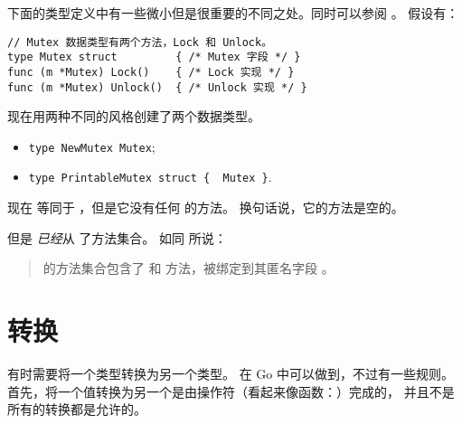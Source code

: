 下面的类型定义中有一些微小但是很重要的不同之处。同时可以参阅 \cite[section~"Type Declarations"]{go_spec}。
假设有：
\begin{lstlisting}
// Mutex 数据类型有两个方法，Lock 和 Unlock。
type Mutex struct         { /* Mutex 字段 */ }
func (m *Mutex) Lock()    { /* Lock 实现 */ }
func (m *Mutex) Unlock()  { /* Unlock 实现 */ }
\end{lstlisting}
现在用两种不同的风格创建了两个数据类型。
\begin{itemize}
\item \lstinline|type NewMutex Mutex|;
\item \lstinline|type PrintableMutex struct {  Mutex }|.
\end{itemize}
现在  等同于 ，但是它没有任何  的方法。
换句话说，它的方法是空的。

但是  \emph{已经}从  了方法集合。
如同 \cite{go_spec} 所说：
\begin{quote}
 的方法集合包含了
 和  方法，被绑定到其匿名字段 。
\end{quote}

\section{转换}
\label{sec:conversions}
有时需要将一个类型转换为另一个类型。
在 Go 中可以做到，不过有一些规则。首先，将一个值转换为另一个是由操作符（看起来像函数：）完成的，
并且不是所有的转换都是允许的。

\begin{table}[H]
\begin{center}
\caption[Valid conversions]{合法的转换， 
\lstinline{float64} 同 \lstinline{float32} 类似}
\label{tab:convesion}

\end{center}
\end{table}


